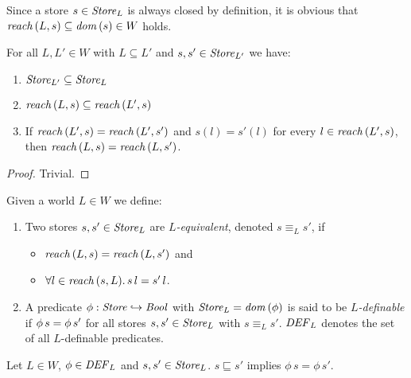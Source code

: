 \documentclass[12pt,a4paper]{report}
\newcommand{\DEF}{\nstyle{DEF}}
\begin{document}
Since a store $s\in\mathit{Store}_L$ is always closed by definition, it is obvious that
$\mathit{reach}\,(L,s) \subseteq \mathit{dom}\,(s) \in  W$ holds.

\begin{lemma}
  For all $L,L'\in W$ with $L \subseteq L'$ and $s,s'\in\mathit{Store}_{L'}$ we have:
  \begin{enumerate}
    \item $\mathit{Store}_{L'} \subseteq \mathit{Store}_L$
    \item $\mathit{reach}\,(L,s) \subseteq \mathit{reach}\,(L',s)$
    \item If $\mathit{reach}\,(L',s) = \mathit{reach}\,(L',s')$ and $s(l) = s'(l)$ for every $l\in\mathit{reach}\,(L',s)$,
          then $\mathit{reach}\,(L,s) = \mathit{reach}\,(L,s')$.
  \end{enumerate}
\end{lemma}

\begin{proof}
  Trivial.
\end{proof}

\begin{definition}
  Given a world $L \in W$ we define:
  \begin{enumerate}
    \item Two stores $s,s'\in\mathit{Store}_L$ are {\em $L$-equivalent}, denoted $s \equiv_L s'$, if
          \begin{itemize}
            \item $\mathit{reach}\,(L,s) = \mathit{reach}\,(L,s')$ and
            \item $\forall l\in\mathit{reach}\,(s,L).\,s\,l=s'\,l$.
          \end{itemize}

    \item A predicate $\phi:\mathit{Store} \hookrightarrow \mathit{Bool}$ with $\mathit{Store}_L = \mathit{dom}\,(\phi)$ is said to be
          {\em $L$-definable} if $\phi\,s = \phi\,s'$ for all stores
          $s,s'\in\mathit{Store}_L$ with $s \equiv_L s'$. $\DEF_L$ denotes the set of all $L$-definable
          predicates.
  \end{enumerate}
\end{definition}

\begin{lemma}[$L$-definability] \label{lemma:L_definability}
  Let $L \in W$, $\phi \in \DEF_L$ and $s,s' \in \mathit{Store}_L$. $s \sqsubseteq s'$ implies
  $\phi\,s = \phi\,s'$.
\end{lemma}
\end{document}
